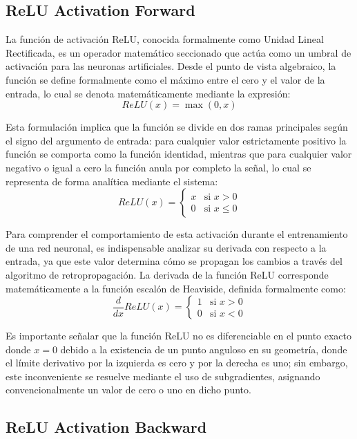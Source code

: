 \documentclass[12pt]{article}
\begin{document}
\subsection{ReLU Activation Forward}

La función de activación ReLU, conocida formalmente como Unidad Lineal Rectificada, 
es un operador matemático seccionado que actúa como un umbral de activación para las neuronas 
artificiales. Desde el punto de vista algebraico, la función se define formalmente como el 
máximo entre el cero y el valor de la entrada, lo cual se denota matemáticamente mediante 
la expresión:
\[
ReLU(x) = \max(0, x)
\]

Esta formulación implica que la función se divide en dos ramas principales según el 
signo del argumento de entrada: para cualquier valor estrictamente positivo la función 
se comporta como la función identidad, mientras que para cualquier valor negativo o igual 
a cero la función anula por completo la señal, lo cual se representa de forma analítica mediante 
el sistema:
\[
ReLU(x) = \begin{cases} x & \text{si } x > 0 \\ 0 & \text{si } x \le 0 \end{cases}
\]

Para comprender el comportamiento de esta activación durante el entrenamiento de una red 
neuronal, es indispensable analizar su derivada con respecto a la entrada, ya que este 
valor determina cómo se propagan los cambios a través del algoritmo de retropropagación. 
La derivada de la función ReLU corresponde matemáticamente a la función escalón de Heaviside, 
definida formalmente como:
\[
\frac{d}{dx}ReLU(x) = \begin{cases} 1 & \text{si } x > 0 \\ 0 & \text{si } x < 0 \end{cases}
\]

Es importante señalar que la función ReLU no es diferenciable en el punto exacto 
donde $x = 0$ debido a la existencia de un punto anguloso en su geometría, donde el 
límite derivativo por la izquierda es cero y por la derecha es uno; sin embargo, este 
inconveniente se resuelve mediante el uso de subgradientes, asignando convencionalmente 
un valor de cero o uno en dicho punto.


\subsection{ReLU Activation Backward}
\end{document}
